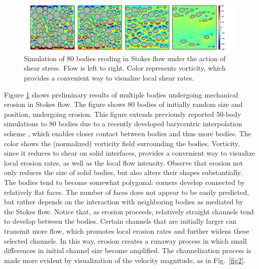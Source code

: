 \documentclass[11pt]{article}
\begin{document}

\begin{figure}%
\begin{center}
\includegraphics[width = 0.99 \textwidth]{./figs/80circ8vort.pdf}
\caption{\label{fig1} Simulation of 80 bodies eroding in Stokes flow under the action of shear stress. Flow is left to right. Color represents vorticity, which provides a convenient way to visualize local shear rates. 
}
\end{center}
\end{figure}
 
 Figure \ref{fig1} shows preliminary results of multiple bodies undergoing mechanical erosion in Stokes flow. The figure shows 80 bodies of initially random size and position, undergoing erosion. This figure extends previously reported 50-body simulations to 80 bodies \cite{Quaife2018} due to a recently developed barycentric interpolation scheme \citep{bar2014, bar-wu-vee2015}, which enables closer contact between bodies and thus more bodies.
The color shows the (normalized) vorticity field surrounding the bodies. Vorticity, since it reduces to shear on solid interfaces, provides a convenient way to visualize local erosion rates, as well as the local flow intensity. Observe that erosion not only reduces the size of solid bodies, but also alters their shapes substantially. The bodies tend to become somewhat polygonal: corners develop connected by relatively flat faces. The number of faces does not appear to be easily predicted, but rather depends on the interaction with neighboring bodies as mediated by the Stokes flow. Notice that, as erosion proceeds, relatively straight channels tend to develop between the bodies. Certain channels that are initially larger can transmit more flow, which promotes local erosion rates and further widens these selected channels. In this way, erosion creates a runaway process in which small differences in initial channel size become amplified. The channelization process is made more evident by visualization of the velocity magnitude, as in Fig.~\ref{fig2}.
\end{document}
